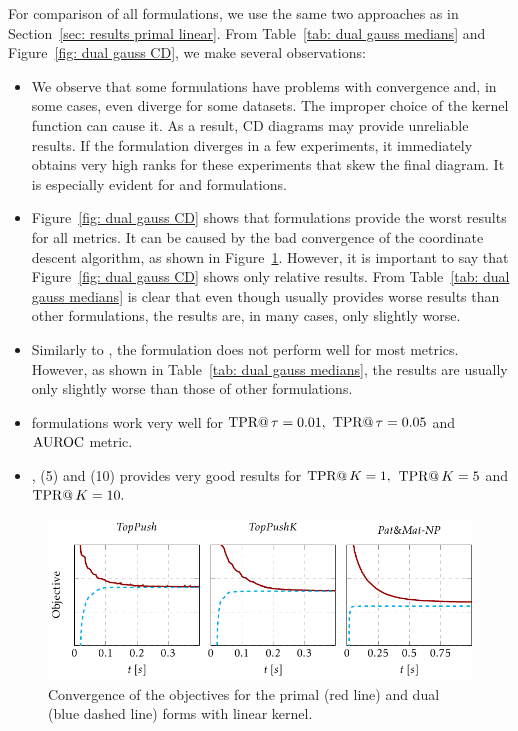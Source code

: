 For comparison of all formulations, we use the same two approaches as in Section~\ref{sec: results primal linear}. From Table~\ref{tab: dual gauss medians} and Figure~\ref{fig: dual gauss CD}, we make several observations:
\begin{itemize}
  \item We observe that some formulations have problems with convergence and, in some cases, even diverge for some datasets. The improper choice of the kernel function can cause it. As a result, CD diagrams may provide unreliable results. If the formulation diverges in a few experiments, it immediately obtains very high ranks for these experiments that skew the final diagram. It is especially evident for \PatMatNP and \SVM formulations.
  \item Figure~\ref{fig: dual gauss CD} shows that \PatMatNP formulations provide the worst results for all metrics. It can be caused by the bad convergence of the coordinate descent algorithm, as shown in Figure~\ref{fig: dual convergence}. However, it is important to say that Figure~\ref{fig: dual gauss CD} shows only relative results. From Table~\ref{tab: dual gauss medians} is clear that even though \PatMatNP usually provides worse results than other formulations, the results are, in many cases, only slightly worse.
  \item Similarly to \PatMatNP, the \SVM formulation does not perform well for most metrics. However, as shown in Table~\ref{tab: dual gauss medians}, the results are usually only slightly worse than those of other formulations.
  \item \tauFPL formulations work very well for $\operatorname{TPR@}\tau = 0.01,$ $\operatorname{TPR@}\tau = 0.05$ and $\operatorname{AUROC}$ metric.
  \item \TopPush, \TopPushK(5) and \TopPushK(10) provides very good results for $\operatorname{TPR@}K = 1,$ $\operatorname{TPR@}K = 5$ and $\operatorname{TPR@}K = 10.$
\end{itemize}

\pagebreak

\begin{figure}
  \centering
  \includegraphics{images/convergence_dual.pdf}
  \caption{Convergence of the objectives for the primal (red line) and dual (blue dashed line) forms with linear kernel.}
  \label{fig: dual convergence}
\end{figure}

